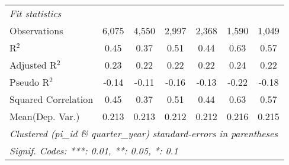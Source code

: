 \begin{tabular}{lcccccc}
   \midrule
   \emph{Fit statistics}\\
   Observations                                               & 6,075           & 4,550          & 2,997    & 2,368    & 1,590          & 1,049\\  
   R$^2$                                                      & 0.45            & 0.37           & 0.51     & 0.44     & 0.63           & 0.57\\  
   Adjusted R$^2$                                             & 0.23            & 0.22           & 0.22     & 0.22     & 0.24           & 0.22\\  
   Pseudo R$^2$                                               & -0.14           & -0.11          & -0.16    & -0.13    & -0.22          & -0.18\\  
   Squared Correlation                                        & 0.45            & 0.37           & 0.51     & 0.44     & 0.63           & 0.57\\  
Mean(Dep. Var.) & 0.213 & 0.213 & 0.212 & 0.212 & 0.216 & 0.215 \\
   \midrule \midrule
   \multicolumn{7}{l}{\emph{Clustered (pi\_id \& quarter\_year) standard-errors in parentheses}}\\
   \multicolumn{7}{l}{\emph{Signif. Codes: ***: 0.01, **: 0.05, *: 0.1}}\\
\end{tabular}
\par\endgroup
